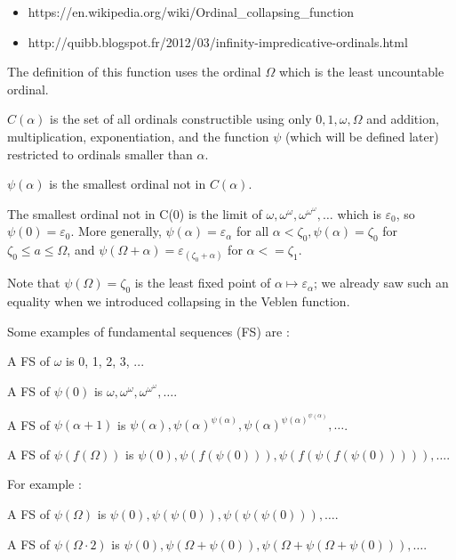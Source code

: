 \documentclass[10pt]{article}
\begin{document}
\begin{itemize}
     \setlength{\itemsep}{1pt}
     \setlength{\parskip}{0pt}
     \setlength{\parsep}{0pt}
\item https://en.wikipedia.org/wiki/Ordinal\_collapsing\_function 
\item http://quibb.blogspot.fr/2012/03/infinity-impredicative-ordinals.html 
\end{itemize}

The definition of this function uses the ordinal \( \Omega \) which is the least uncountable ordinal. 

\( C(\alpha) \) is the set of all ordinals constructible using only \( 0, 1, \omega, \Omega \) and addition, multiplication, exponentiation, and the function \( \psi \) (which will be defined later) restricted to ordinals smaller than \( \alpha \).

\( \psi(\alpha) \) is the smallest ordinal not in \( C(\alpha) \). 

The smallest ordinal not in C(0) is the limit of \( \omega, \omega^\omega, \omega^{\omega^\omega}, \ldots \) which is \( \varepsilon_0 \), so \( \psi(0) = \varepsilon_0 \). More generally, \( \psi(\alpha) = \varepsilon_\alpha \) for all \( \alpha < \zeta_0, \psi(\alpha) = \zeta_0 \) for \( \zeta_0 \leq a \leq \Omega \), and \( \psi(\Omega+\alpha) = \varepsilon_(\zeta_0+\alpha) \) for \( \alpha <= \zeta_1 \). 

Note that \( \psi(\Omega) = \zeta_0 \) is the least fixed point of \( \alpha \mapsto \varepsilon_\alpha \); we already saw such an equality when we introduced collapsing in the Veblen function.

Some examples of fundamental sequences (FS) are :

A FS of \( \omega \) is 0, 1, 2, 3, ...

A FS of \( \psi(0) \) is \( \omega, \omega^\omega, \omega^{\omega^\omega}, \ldots \).

A FS of \( \psi(\alpha+1) \) is \( \psi(\alpha), \psi(\alpha)^{\psi(\alpha)}, \psi(\alpha)^{\psi(\alpha)^{\psi(\alpha)}}, \ldots \).

A FS of \( \psi(f(\Omega)) \) is \( \psi(0), \psi(f(\psi(0))), \psi(f(\psi(f(\psi(0))))), \ldots \).

For example :

A FS of \( \psi(\Omega) \) is \( \psi(0), \psi(\psi(0)), \psi(\psi(\psi(0))), \ldots \).

A FS of \( \psi(\Omega \cdot 2) \) is \( \psi(0), \psi(\Omega+\psi(0)), \psi(\Omega+\psi(\Omega+\psi(0))), \ldots \).
\end{document}
